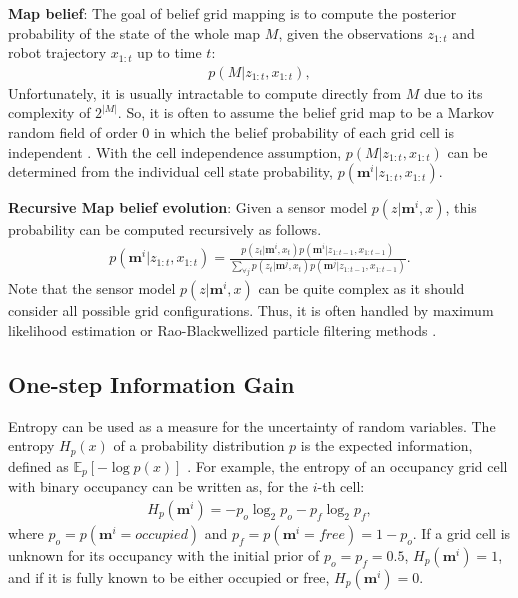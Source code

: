 \documentclass{article}
\newcommand{\ph}[1]{{\textbf{#1}:}} %
\begin{document}
\ph{Map belief} The goal of belief grid mapping is to compute the posterior probability of the state of the whole map $M$, given the observations $z_{1:t}$ and robot trajectory $x_{1:t}$ up to time $t$:
\begin{align}
  p(M | z_{1:t}, x_{1:t}),
\end{align}
Unfortunately, it is usually intractable to compute directly from $M$ due to its complexity of $2^{|M|}$.
So, it is often to assume the belief grid map to be a Markov random field of order 0 in which the belief probability of each grid cell is independent \cite{TBF05,elfes1990stochastic}.
With the cell independence assumption, $p(M | z_{1:t}, x_{1:t})$ can be determined from the individual cell state probability, $p(\mathbf{m}^i | z_{1:t}, x_{1:t})$.

\ph{Recursive Map belief evolution} Given a sensor model $p(z | \mathbf{m}^i, x)$, this probability can be computed recursively as follows.
\begin{align}
  p(\mathbf{m}^i | z_{1:t}, x_{1:t}) =
  \frac{p(z_t | \mathbf{m}^i, x_{t}) p(\mathbf{m}^i | z_{1:t-1}, x_{1:t-1})}
       {\sum_{\forall j} p(z_t | \mathbf{m}^j, x_{t}) p(\mathbf{m}^j | z_{1:t-1}, x_{1:t-1})}.
\end{align}
Note that the sensor model $p(z | \mathbf{m}^i, x)$ can be quite complex as it should consider all possible grid configurations.
Thus, it is often handled by maximum likelihood estimation or Rao-Blackwellized particle filtering methods \cite{burgard2005coordinated,stachniss2005information}.

\subsection{One-step Information Gain}
Entropy can be used as a measure for the uncertainty of random variables.
The entropy $H_p(x)$ of a probability distribution $p$ is the expected information, defined as $\mathbb{E}_p[-\log p(x)]$ \cite{cover2012elements}.
For example, the entropy of an occupancy grid cell with binary occupancy can be written as, for the $i$-th cell:
\begin{align}
  H_p(\mathbf{m}^i) = -p_o \log_2 p_{o} - p_f \log_2 p_f,
\end{align}
where $p_o = p(\mathbf{m}^i = occupied)$ and $p_f = p(\mathbf{m}^i = free) = 1 - p_o$.
If a grid cell is unknown for its occupancy with the initial prior of $p_o = p_f = 0.5$, $H_p(\mathbf{m}^i) = 1$, and if it is fully known to be either occupied or free, $H_{p}(\mathbf{m}^i) = 0$.
%
\end{document}

